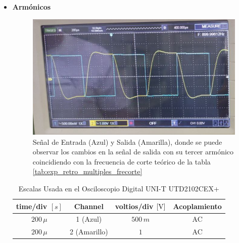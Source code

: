              \begin{itemize}
                \item \textbf{Armónicos}

                     \begin{figure}[H]
                        \centering
                        \renewcommand{\figurename}{Imagen}
                        \setcounter{figure}{15}
                        \includegraphics[width=15cm]{Imagenes/armonico_retro_multiples.png}
                        \caption{Señal de Entrada (Azul) y Salida (Amarilla), donde se puede observar los cambios en la señal de salida con su tercer armónico coincidiendo con la frecuencia de corte teórico de la tabla \ref{tab:exp_retro_multiples_frecorte}}
                        \label{fig:armonico_retro_multiples}
                    \end{figure}
            
                    \begin{table}[H]
                        \centering
                        \begin{tabular}{|c|c|c|c|}
                            \hline
                            \textbf{time/div} $[s]$ & \textbf{Channel} & \textbf{voltios/div $[\volt]$} & \textbf{Acoplamiento} \\ \hline
                            $200 \, \mu$ & 1 (Azul) &  $500 \, m $ & AC \\ \hline
                            $200 \, \mu$ & 2 (Amarillo)  &   $1  $ & AC \\ \hline  
                        \end{tabular}
                        \caption{Escalas Usada en el Osciloscopio Digital UNI-T UTD2102CEX+}
                        \label{tab:escala_exp_retro_multiples_armonico}
                    \end{table}
            \end{itemize}


